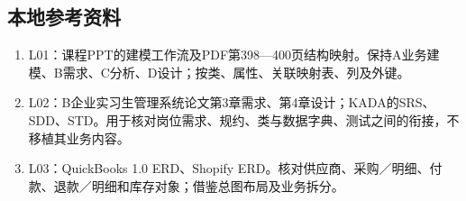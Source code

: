 \documentclass[UTF8,a4paper,zihao=-4,fontset=none]{ctexart}
\begin{document}
\subsection{本地参考资料}
\begin{enumerate}
\item L01：课程PPT的建模工作流及PDF第398—400页结构映射。保持A业务建模、B需求、C分析、D设计；按类、属性、关联映射表、列及外键。
\item L02：B企业实习生管理系统论文第3章需求、第4章设计；KADA的SRS、SDD、STD。用于核对岗位需求、规约、类与数据字典、测试之间的衔接，不移植其业务内容。
\item L03：QuickBooks 1.0 ERD、Shopify ERD。核对供应商、采购／明细、付款、退款／明细和库存对象；借鉴总图布局及业务拆分。
\end{enumerate}
\end{document}
